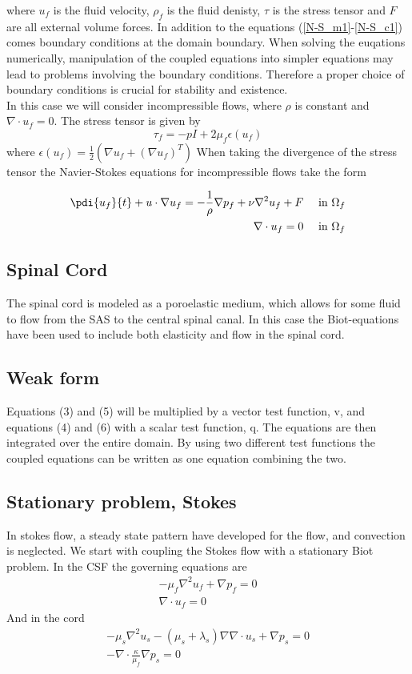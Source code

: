 where $u_f$ is the fluid velocity, $\rho_f$ is the fluid denisty, $\tau$ is the stress tensor and $F$ are all external volume forces. In addition to the equations (\eqref{N-S_m1}-\eqref{N-S_c1}) comes boundary conditions at the domain boundary. When solving the euqations numerically, manipulation of the coupled equations into simpler equations may lead to problems involving the boundary conditions. Therefore a proper choice of boundary conditions is crucial for stability and existence. 
\\
In this case we will consider incompressible flows, where $\rho$ is constant and $\nabla \cdot u_f = 0$. The stress tensor is given by
\[ \tau_f = -pI + 2 \mu_f \epsilon(u_f) \]
where $\epsilon(u_f) = \frac{1}{2}(\nabla u_f + (\nabla u_f)^T)$
When taking the divergence of the stress tensor the Navier-Stokes equations for incompressible flows take the form

\begin{align}
	\pdi{u_f}{t} + u\cdot \nabla u_f = -\frac{1}{\rho}\nabla p_f + \nu \nabla ^2 u_f + F && 	\text{ in } \Omega_f 
	\\
	\nabla \cdot u_f = 0 && \text{ in } \Omega_f
\end{align}



\subsection{Spinal Cord}
The spinal cord is modeled as a poroelastic medium, which allows for some fluid to flow from the SAS to the central spinal canal. In this case the Biot-equations have been used to include both elasticity and flow in the spinal cord. 
 
\subsection{Weak form}
Equations (3) and (5) will be multiplied by a vector test function, v, and equations (4) and (6) with a scalar test function, q. The equations are then integrated over the entire domain. By using two different test functions the coupled equations can be written as one equation combining the two. \\	
\subsection{Stationary problem, Stokes}
In stokes flow, a steady state pattern have developed for the flow, and convection is neglected. We start with coupling the Stokes flow with a stationary Biot problem. In the CSF the governing equations are
\begin{align}
	- \mu_f \nabla ^2 u_f
	+ \nabla p_f
	= 0 \nonumber \\
	\nabla \cdot u_f = 0
\end{align}
And in the cord
\begin{align}
	- \mu_s \nabla^2 u_s 
	- (\mu_s + \lambda_s) \nabla \nabla \cdot u_s
	+ \nabla p_s = 0 \nonumber \\ 
	- \nabla \cdot \frac{\kappa}{\mu_f} \nabla p_s = 0
\end{align}

